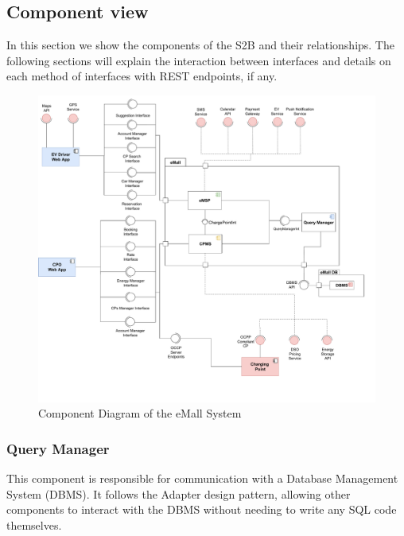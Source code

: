 \subsection{Component view}
In this section we show the components of the S2B and their relationships. The following sections will explain the interaction between interfaces and details on each method of interfaces with REST endpoints, if any.

\begin{figure}[H]
    \centering
    \hspace*{-2cm}
    \includegraphics[scale=0.5]{src/ComponentDiagram/overview_component_diagram.pdf}
    \caption{Component Diagram of the eMall System}
\end{figure}

\subsubsection{Query Manager}
This component is responsible for communication with a Database Management System (DBMS). It follows the Adapter design pattern, allowing other components to interact with the DBMS without needing to write any SQL code themselves.

